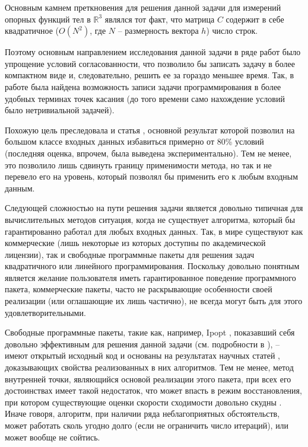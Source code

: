 \documentclass[a4paper, 10pt]{article}
\theoremstyle{definition}
\theoremstyle{plain}
\theoremstyle{plain}
\begin{document}
Основным камнем преткновения для решения данной задачи для измерений опорных
функций тел в $\mathbb{R}^3$ являлся тот факт, что матрица $C$ содержит в себе
квадратичное ($O(N^2)$, где $N$ -- размерность вектора $h$) число строк.

Поэтому основным направлением исследования данной задачи в ряде работ было
упрощение условий согласованности, что позволило бы записать задачу в более
компактном виде и, следовательно, решить ее за гораздо меньшее время. Так, в
работе \cite{GardnerKiderlen} была найдена возможность записи задачи
программирования в более удобных терминах точек касания (до того времени само
нахождение условий было нетривиальной задачей).

Похожую цель преследовала и статья \cite{palachev}, основной результат которой
позволил на большом классе входных данных избавиться примерно от 80\% условий
(последняя оценка, впрочем, была выведена экспериментально). Тем не
менее, это позволило лишь сдвинуть границу применимости метода, но так и не
перевело его на уровень, который позволял бы применить его к любым входным
данным.

Следующей сложностью на пути решения задачи является довольно типичная для
вычислительных методов ситуация, когда не существует алгоритма, который бы
гарантированно работал для любых входных данных. Так, в мире существуют
как коммерческие (лишь некоторые из которых доступны по академической лицензии),
так и свободные программные пакеты для решения задач квадратичного или
линейного программирования. Поскольку довольно понятным является желание
пользователя иметь гарантированное поведение программного пакета, коммерческие
пакеты, часто не раскрывающие особенности своей реализации (или оглашающие их
лишь частично), не всегда могут быть для этого удовлетворительными.

Свободные программные пакеты, такие как, например, Ipopt \cite{Ipopt},
показавший себя довольно эффективным для решения данной задачи (см. подробности
в \cite{palachev}), -- имеют открытый исходный код и основаны на результатах
научных статей \cite{WachterBiegler, WachterBiegler2}, доказывающих
свойства реализованных в них алгоритмов. Тем не менее, метод внутренней точки,
являющийся основой реализации этого пакета, при всех его достоинствах
имеет такой недостаток,
что может впасть в режим восстановления, при котором существующие оценки
скорости сходимости довольно скудны \cite {WachterBiegler2}.
Иначе говоря, алгоритм, при наличии ряда неблагоприятных обстоятельств,
может работать сколь угодно долго (если не ограничить число итераций), или
может вообще не сойтись.
\end{document}
